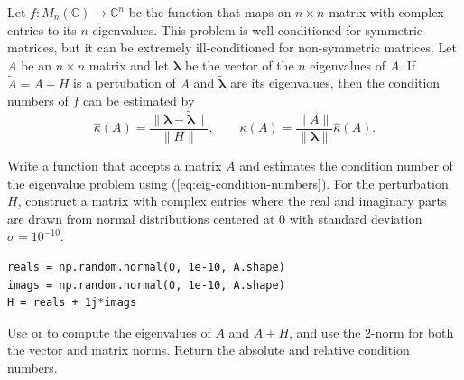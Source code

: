 Let $f:M_n(\mathbb{C}) \rightarrow \mathbb{C}^n$ be the function that maps an $n \times n$ matrix with complex entries to its $n$ eigenvalues.
This problem is well-conditioned for symmetric matrices, but it can be extremely ill-conditioned for non-symmetric matrices.
Let $A$ be an $n\times n$ matrix and let $\boldsymbol{\lambda}$ be the vector of the $n$ eigenvalues of $A$.
If $\tilde{A} = A + H$ is a pertubation of $A$ and $\tilde{\boldsymbol{\lambda}}$ are its eigenvalues, then the condition numbers of $f$ can be estimated by
\begin{equation}
\hat{\kappa}(A) = \frac{\|\boldsymbol{\lambda} - \tilde{\boldsymbol{\lambda}}\|}{\|H\|},
\qquad
\kappa(A) = \frac{\|A\|}{\|\boldsymbol{\lambda}\|}\hat{\kappa}(A).
\label{eq:eig-condition-numbers}
\end{equation}

\begin{problem}\label{prob:eigenvalue} %
Write a function that accepts a matrix $A$ and estimates the condition number of the eigenvalue problem using (\ref{eq:eig-condition-numbers}).
For the perturbation $H$, construct a matrix with complex entries where the real and imaginary parts are drawn from normal distributions centered at $0$ with standard deviation $\sigma = 10^{-10}$.
\begin{lstlisting}
reals = np.random.normal(0, 1e-10, A.shape)
imags = np.random.normal(0, 1e-10, A.shape)
H = reals + 1j*imags
\end{lstlisting}
Use  or  to compute the eigenvalues of $A$ and $A+H$, and use the 2-norm for both the vector and matrix norms.
Return the absolute and relative condition numbers.
\label{prob:eig-condit}
\end{problem}

